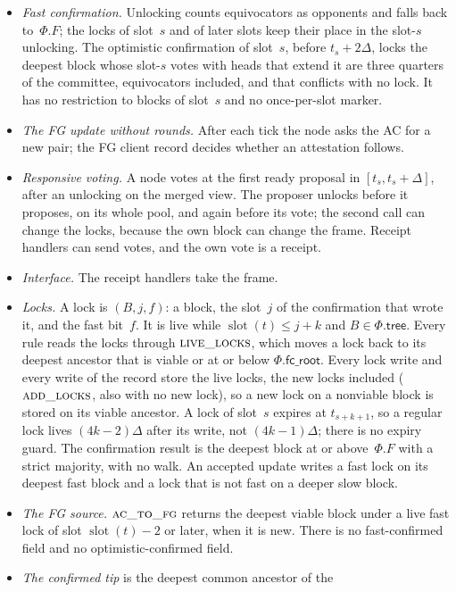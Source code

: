 \documentclass{article}
\newcommand{\slot}{\operatorname{slot}}
\newcommand{\Fr}{\Phi}
\newcommand{\tree}{\mathsf{tree}}
\newcommand{\fcroot}{\mathsf{fc\_root}}
\newcommand{\fname}[1]{\text{\textsc{#1}}}
\begin{document}
\begin{itemize}
\item[(P1)] \emph{Fast confirmation.}  Unlocking counts equivocators as
  opponents and falls back to~$\Fr.F$; the locks of slot~$s$ and of later
  slots keep their place in the slot-$s$ unlocking.  The optimistic
  confirmation of slot~$s$, before $t_s+2\Delta$, locks the deepest block
  whose slot-$s$ votes with heads that extend it are three quarters of the
  committee, equivocators included, and that conflicts with no lock.  It
  has no restriction to blocks of slot~$s$ and no once-per-slot marker.
\item[(P2)] \emph{The FG update without rounds.}  After each tick the node
  asks the AC for a new pair; the FG client record decides whether an
  attestation follows.
\item[(P3)] \emph{Responsive voting.}  A node votes at the first ready
  proposal in $[t_s,t_s+\Delta]$, after an unlocking on the merged view.
  The proposer unlocks before it proposes, on its whole pool, and again
  before its vote; the second call can change the locks, because the own
  block can change the frame.  Receipt handlers can send votes, and the
  own vote is a receipt.
\item[(P4)] \emph{Interface.}  The receipt handlers take the frame.
\item[(P5)] \emph{Locks.}  A lock is $(B,j,f)$: a block, the slot~$j$ of
  the confirmation that wrote it, and the fast bit~$f$.  It is live while
  $\slot(t)\leq j+k$ and $B\in\Fr.\tree$.
  Every rule reads the locks through $\fname{live\_locks}$, which moves a
  lock back to its deepest ancestor that is viable or at or below
  $\Fr.\fcroot$.  Every lock write and every write of the record store
  the live locks, the new locks included ($\fname{add\_locks}$, also with
  no new lock), so a new lock on a nonviable block is stored on its viable
  ancestor.  A
  lock of slot~$s$ expires at $t_{s+k+1}$, so a regular lock lives
  $(4k-2)\Delta$ after its write, not $(4k-1)\Delta$; there is no expiry
  guard.  The confirmation result is the deepest block at or
  above~$\Fr.F$ with a strict majority, with no walk.  An accepted update writes a fast lock on its deepest fast block
  and a lock that is not fast on a deeper slow block.
\item[(P6)] \emph{The FG source.}  $\fname{ac\_to\_fg}$ returns the
  deepest viable block under a live fast lock of slot $\slot(t)-2$ or
  later, when it is new.  There is no fast-confirmed field and no
  optimistic-confirmed field.
\item[(P7)] \emph{The confirmed tip} is the deepest common ancestor of the

\end{itemize}
\end{document}
